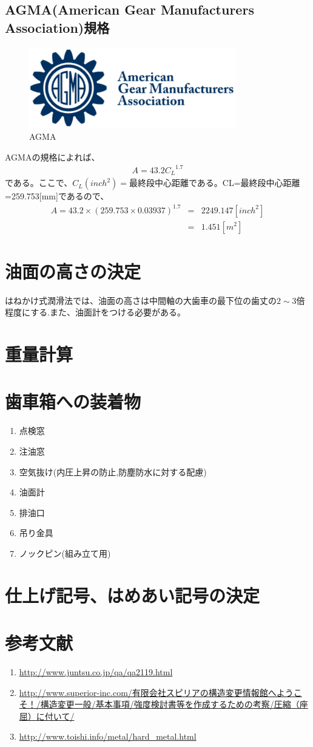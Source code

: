 \documentclass[a4j,twoside,openright,11pt]{jreport}
\begin{document}
\subsection{AGMA(American Gear Manufacturers Association)規格}
\begin{figure}[htbp]
  \begin{center}
\includegraphics[width=9cm]{20127161210319005.eps}
\end{center}
\caption{AGMA}
\end{figure}
AGMAの規格によれば、
\begin{eqnarray}
A=43.2{C_L}^{1.7}
\end{eqnarray}
である。ここで、$C_L(inch^2)=最終段中心距離$である。CL=最終段中心距離=259.753[mm]であるので、
\begin{eqnarray}
A=43.2 \times (259.753 \times 0.03937)^{1.7} &=& 2249.147 [inch^2]\\
&=&1.451[m^2]
\end{eqnarray}

\section{油面の高さの決定}
はねかけ式潤滑法では、油面の高さは中間軸の大歯車の最下位の歯丈の$2\sim3$倍程度にする.また、油面計をつける必要がある。
\section{重量計算}

\section{歯車箱への装着物}
\begin{enumerate}
\item 点検窓
\item 注油窓
\item 空気抜け(内圧上昇の防止,防塵防水に対する配慮)
\item 油面計
\item 排油口
\item 吊り金具
\item ノックピン(組み立て用)
\end{enumerate}
\section{仕上げ記号、はめあい記号の決定}

\section{参考文献}
\begin{enumerate}
\item \url{http://www.juntsu.co.jp/qa/qa2119.html}
\item \url{http://www.superior-inc.com/有限会社スピリアの構造変更情報館へようこそ！/構造変更一般/基本事項/強度検討書等を作成するための考察/圧縮（座屈）に付いて/}
\item \url{http://www.toishi.info/metal/hard_metal.html}
\end{enumerate}
\end{document}

